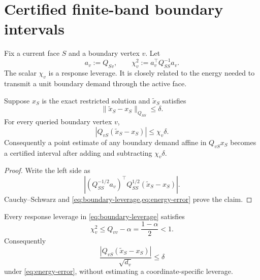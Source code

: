 \section{Certified finite-band boundary intervals}
\label{sec:intervals}

Fix a current face $S$ and a boundary vertex $v$.  Let
\begin{equation}
 a_v:=Q_{Sv},
 \qquad
 \chi_v^2:=a_v^\top Q_{SS}^{-1}a_v.
 \label{eq:boundary-leverage}
\end{equation}
The scalar $\chi_v$ is a response leverage.  It is closely related to the
energy needed to transmit a unit boundary demand through the active face.

\begin{lemma}
\label{lem:boundary-interval}
Suppose $x_S$ is the exact restricted solution and $\widetilde x_S$ satisfies
\begin{equation}
 \|\widetilde x_S-x_S\|_{Q_{SS}}\leq\delta.
 \label{eq:energy-error}
\end{equation}
For every queried boundary vertex $v$,
\begin{equation}
 \left|
 Q_{vS}(\widetilde x_S-x_S)
 \right|
 \leq \chi_v\delta.
 \label{eq:boundary-error}
\end{equation}
Consequently a point estimate of any boundary demand affine in $Q_{vS}x_S$
becomes a certified interval after adding and subtracting $\chi_v\delta$.
\end{lemma}

\begin{proof}
Write the left side as
\[
 \left|
 (Q_{SS}^{-1/2}a_v)^\top
 Q_{SS}^{1/2}(\widetilde x_S-x_S)
 \right|.
\]
Cauchy--Schwarz and \cref{eq:boundary-leverage,eq:energy-error} prove the
claim.
\end{proof}

\begin{corollary}
\label{cor:boundary-leverage-one}
Every response leverage in \cref{eq:boundary-leverage} satisfies
\begin{equation}
 \chi_v^2\leq Q_{vv}-\alpha=\frac{1-\alpha}{2}<1.
 \label{eq:boundary-leverage-one}
\end{equation}
Consequently
\begin{equation}
 \frac{\left|Q_{vS}(\widetilde x_S-x_S)\right|}{\sqrt{d_v}}
 \leq\delta
 \label{eq:normalized-boundary-error}
\end{equation}
under \cref{eq:energy-error}, without estimating a coordinate-specific
leverage.
\end{corollary}

